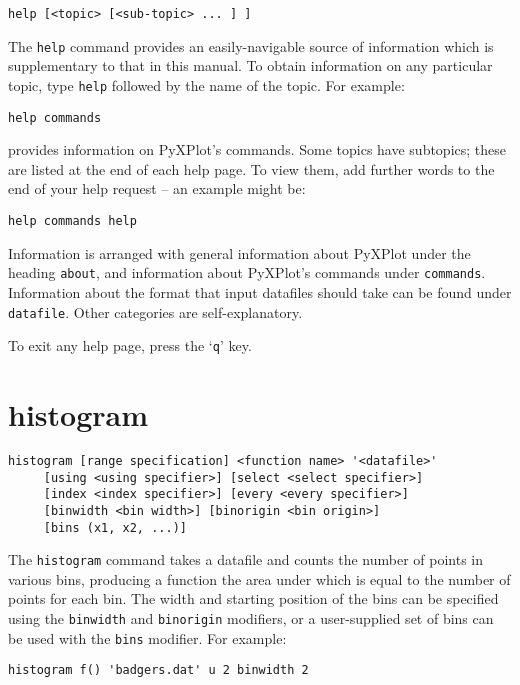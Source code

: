 \documentclass[a4paper,onecolumn,11pt]{book}
\begin{document}
\begin{verbatim}
help [<topic> [<sub-topic> ... ] ]
\end{verbatim}

The {\tt help} command provides an easily-navigable source of information which
is supplementary to that in this manual.  To obtain information on any
particular topic, type {\tt help} followed by the name of the topic. For
example:

\begin{verbatim}
help commands
\end{verbatim}

\noindent provides information on PyXPlot's commands. Some topics have subtopics; these
are listed at the end of each help page. To view them, add further words to the
end of your help request -- an example might be:

\begin{verbatim}
help commands help
\end{verbatim}

Information is arranged with general information about PyXPlot under the heading
{\tt about}, and information about PyXPlot's commands under {\tt commands}.
Information about the format that input datafiles should take can be found
under {\tt datafile}.  Other categories are self-explanatory.

To exit any help page, press the `{\tt q}' key.

\section{histogram}

\begin{verbatim}
histogram [range specification] <function name> '<datafile>' 
     [using <using specifier>] [select <select specifier>]
     [index <index specifier>] [every <every specifier>]
     [binwidth <bin width>] [binorigin <bin origin>]
     [bins (x1, x2, ...)]
\end{verbatim}

The {\tt histogram} command takes a datafile and counts the number of points in
various bins, producing a function the area under which is equal to the number
of points for each bin.  The width and starting position of the bins can be
specified using the {\tt binwidth} and {\tt binorigin} modifiers, or a
user-supplied set of bins can be used with the {\tt bins} modifier.  For
example:

\begin{verbatim}
histogram f() 'badgers.dat' u 2 binwidth 2
\end{verbatim}
\end{document}
